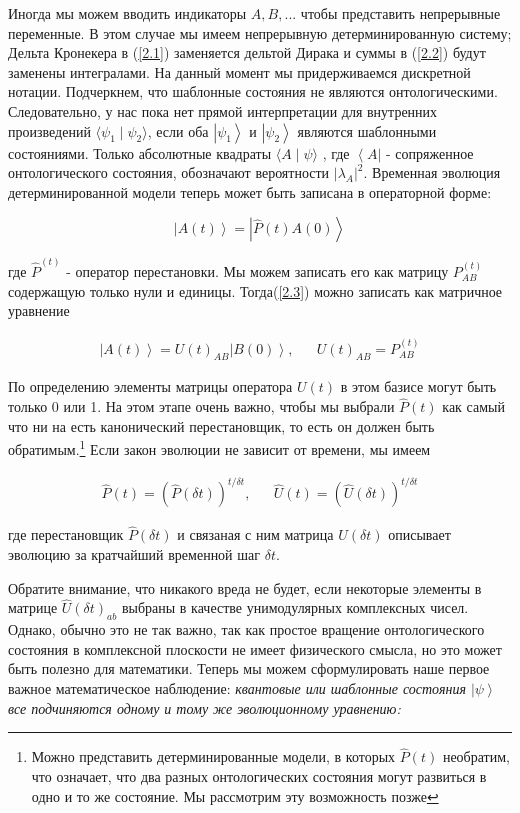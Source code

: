 \documentclass[main.tex]{subfiles}
\begin{document}
Иногда мы можем вводить индикаторы $A,B,...$ чтобы представить непрерывные переменные. В этом случае мы имеем непрерывную детерминированную систему; Дельта Кронекера в (\ref{2.1}) заменяется дельтой Дирака и суммы в (\ref{2.2}) будут заменены интегралами. На данный момент мы придерживаемся дискретной нотации. Подчеркнем, что шаблонные состояния не являются онтологическими. Следовательно, у нас пока нет прямой интерпретации для внутренних произведений $\langle\psi_1\mid\psi_2\rangle$, если оба $\left|\psi_1\right>$ и $\left|\psi_2\right>$ являются шаблонными состояниями. Только абсолютные квадраты $\langle A\mid \psi\rangle $ , где $\left<A\right|$ - сопряженное онтологического состояния, обозначают вероятности $|\lambda_A|^2$. Временная эволюция детерминированной модели теперь может быть записана в операторной форме: 

\begin{equation}\label{2.3}
	\left|A(t)\right> = \left|\hat P(t)A(0)\right>
\end{equation}

где $\hat P^{(t)}$ - оператор перестановки. Мы можем записать его как матрицу $P^{(t)}_{AB}$ содержащую только нули и единицы. Тогда(\ref{2.3}) можно записать как матричное уравнение

\begin{align}\label{2.4}
	\left|A(t)\right> = U(t)_{AB}\left|B(0)\right>, &&
	U(t)_{AB} = P^{(t)}_{AB}
\end{align}

По определению элементы матрицы оператора $U(t)$ в этом базисе могут быть только 0 или 1.
На этом этапе очень важно, чтобы мы выбрали $\hat P(t)$ как самый что ни на есть канонический перестановщик, то есть он должен быть обратимым.\footnote{Можно представить детерминированные модели, в которых $\hat P(t)$ необратим, что означает, что два разных онтологических состояния могут развиться в одно и то же состояние. Мы рассмотрим эту возможность позже} Если закон эволюции не зависит от времени, мы имеем

\begin{align}\label{2.5}
	\hat P(t) = (\hat P(\delta t))^{t/\delta t}, && 
	\hat U(t) = (\hat U(\delta t))^{t/\delta t}
\end{align}

где перестановщик $\hat P(\delta t)$ и связаная с ним матрица $\hat U(\delta t)$ описывает эволюцию за кратчайший временной шаг $\delta t$.

Обратите внимание, что никакого вреда не будет, если некоторые элементы в матрице $\hat U(\delta t)_{ab}$ выбраны в качестве унимодулярных комплексных чисел. Однако, обычно это не так важно, так как простое вращение онтологического состояния в комплексной плоскости не имеет физического смысла, но это может быть полезно для математики.
Теперь мы можем сформулировать наше первое важное математическое наблюдение: \textit{квантовые или шаблонные состояния $\left|\psi\right>$ все подчиняются одному и тому же эволюционному уравнению:}
\end{document}
